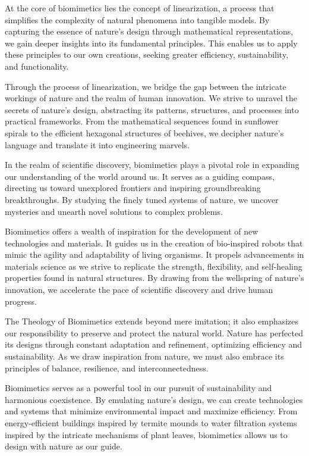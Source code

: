 \documentclass[ebook,12pt,oneside,openany]{memoir}
\begin{document}
\indent At the core of biomimetics lies the concept of linearization, a process that simplifies the complexity of natural phenomena into tangible models. By capturing the essence of nature's design through mathematical representations, we gain deeper insights into its fundamental principles. This enables us to apply these principles to our own creations, seeking greater efficiency, sustainability, and functionality.

\indent Through the process of linearization, we bridge the gap between the intricate workings of nature and the realm of human innovation. We strive to unravel the secrets of nature's design, abstracting its patterns, structures, and processes into practical frameworks. From the mathematical sequences found in sunflower spirals to the efficient hexagonal structures of beehives, we decipher nature's language and translate it into engineering marvels.

\indent In the realm of scientific discovery, biomimetics plays a pivotal role in expanding our understanding of the world around us. It serves as a guiding compass, directing us toward unexplored frontiers and inspiring groundbreaking breakthroughs. By studying the finely tuned systems of nature, we uncover mysteries and unearth novel solutions to complex problems.

\indent Biomimetics offers a wealth of inspiration for the development of new technologies and materials. It guides us in the creation of bio-inspired robots that mimic the agility and adaptability of living organisms. It propels advancements in materials science as we strive to replicate the strength, flexibility, and self-healing properties found in natural structures. By drawing from the wellspring of nature's innovation, we accelerate the pace of scientific discovery and drive human progress.

\indent The Theology of Biomimetics extends beyond mere imitation; it also emphasizes our responsibility to preserve and protect the natural world. Nature has perfected its designs through constant adaptation and refinement, optimizing efficiency and sustainability. As we draw inspiration from nature, we must also embrace its principles of balance, resilience, and interconnectedness.

\indent Biomimetics serves as a powerful tool in our pursuit of sustainability and harmonious coexistence. By emulating nature's design, we can create technologies and systems that minimize environmental impact and maximize efficiency. From energy-efficient buildings inspired by termite mounds to water filtration systems inspired by the intricate mechanisms of plant leaves, biomimetics allows us to design with nature as our guide.
\end{document}

